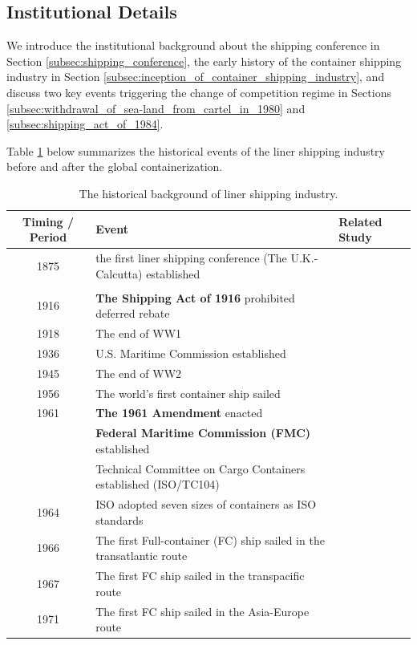 \documentclass[11pt]{article}
\begin{document}
\subsection{Institutional Details}\label{subsec:institutional_details}
We introduce the institutional background about the shipping conference in Section \ref{subsec:shipping_conference}, the early history of the container shipping industry in Section \ref{subsec:inception_of_container_shipping_industry}, and discuss two key events triggering the change of competition regime in Sections \ref{subsec:withdrawal_of_sea-land_from_cartel_in_1980} and \ref{subsec:shipping_act_of_1984}.


Table \ref{tb:industry_history} below summarizes the historical events of the liner shipping industry before and after the global containerization.
\begin{table}[ht!]
    \caption{The historical background of liner shipping industry.}
    \label{tb:industry_history}
    \centering\scriptsize{}
    \begin{tabular}{cll}
      Timing / Period & Event & Related Study\\\hline
      1875 & the first liner shipping conference (The U.K.-Calcutta) established & \cite{morton1997entry}\\
       &  & \cite{podolny1999social}\\
      1916 & \textbf{The Shipping Act of 1916} prohibited deferred rebate &\\
      1918 & The end of WW1 & \cite{deltas1999american}\\
      1936 & U.S. Maritime Commission established &\\
      1945 & The end of WW2 & \\
      1956 & The world's first container ship sailed & \\
      1961 & \textbf{The 1961 Amendment} enacted & \\
      & \textbf{Federal Maritime Commission (FMC)} established & \\
      & Technical Committee on Cargo Containers established (ISO/TC104) &\\
      1964 & ISO adopted seven sizes of containers as ISO standards &\\
      \hline
      1966 & The first Full-container (FC) ship sailed in the transatlantic route &\\
      1967 & The first FC ship sailed in the transpacific route &\\
      1971 & The first FC ship sailed in the Asia-Europe route& \\

\end{tabular}
\end{table}
\end{document}
